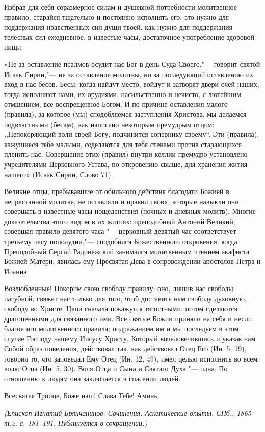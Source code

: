 \begin{mymulticols}
Избрав для себя соразмерное силам и душевной потребности молитвенное правило, старайся тщательно и постоянно исполнять его: это нужно для поддержания нравственных сил души твоей, как нужно для поддержания телесных сил ежедневное, в известые часы, достаточное употребление здоровой пищи.

«Не за оставление псалмов осудит нас Бог в день Суда Своего,"--- говорит святой Исаак Сирин,"--- не за оставление молитвы, но за последующий оставлению их вход в нас бесов. Бесы, когда найдут место, войдут и затворят двери очей наших, тогда исполняют нами, их орудиями, насильственно и нечисто, с лютейшим отмщением, все воспрещенное Богом. И по причине оставления малого (правила), за которое (мы) сподобляемся заступления Христова, мы делаемся подвластными (бесам), как написано некоторым премудрым отцом: ,,Непокоряющий воли своей Богу, подчинится сопернику своему``. Эти (правила), кажущиеся тебе малыми, соделаются для тебя стенами против старающихся пленить нас. Совершение этих (правил) внутри келлии премудро установлено учредителями Церковного Устава, по откровению свыше, для хранения жития нашего» (Исаак Сирин, Слово 71).

Великие отцы, пребывавшие от обильного действия благодати Божией в непрестанной молитве, не оставляли и правил своих, которые навыкли они совершать в известные часы нощеденствия (ночных и дневных молитв). Многие доказательства этого видим в их житиях: преподобный Антоний Великий, совершая правило девятого часа "--- церковный девятый час соответствует третьему часу пополудни,"--- сподобился Божественного откровения; когда Преподобный Сергий Радонежский занимался молитвенным чтением акафиста Божией Матери, явилась ему Пресвятая Дева в сопровождении апостолов Петра и Иоанна.

Возлюбленные! Покорим свою свободу правилу: оно, лишив нас свободы пагубной, свяжет нас только для того, чтоб доставить нам свободу духовную, свободу во Христе. Цепи сначала покажутся тягостными, потом сделаются драгоценными для связанного ими. Все святые Божии приняли на себя и несли благое иго молитвенного правила; подражанием им и мы последуем в этом случае Господу нашему Иисусу Христу, Который вочеловечившись и указав нам Собой образ поведения, действовал так, как действовал Отец Его (Ин. 5, 19), говорил то, что заповедал Ему Отец (Ин. 12, 49), имел целью исполнить во всем волю Отца (Ин. 5, 30). Воля Отца и Сына и Святаго Духа "--- одна. По отношению к людям она заключается в спасении людей.

Всесвятая Троице, Боже наш! Слава Тебе! Аминь.

\bigskip

{\itshape (Епископ Игнатий Брянчанинов. Сочинения. Аскетические опыты.
СПб., 1865 т.2, с. 181--191. Публикуется в сокращении.)}

\end{mymulticols} 


